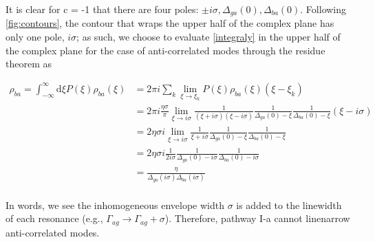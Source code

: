 \documentclass[aip, jcp, reprint, onecolumn]{revtex4-2}
\begin{document}
It is clear for c = -1 that there are four poles: $\pm i \sigma, \Delta_{ga}(0), \Delta_{ba}(0)$. 
Following \autoref{fig:contours}, the contour that wraps the upper half of the complex plane has only one pole, $i \sigma$; as such, we choose to evaluate \autoref{integraly} in the upper half of the complex plane for the case of anti-correlated modes through the residue theorem as
\begin{widetext}
	\begin{equation}
		\begin{split}
			\rho_{ba} = \int_{-\infty}^\infty \mathrm{d}\xi P(\xi) \rho_{ba}(\xi) &= 2\pi i \sum_k \lim_{\xi \rightarrow \xi_k} P(\xi) \rho_{ba}(\xi) (\xi - \xi_k)\\
			&= 2\pi i \frac{\eta \sigma}{\pi} \lim_{\xi \rightarrow i\sigma} \frac{1}{(\xi + i\sigma)(\xi - i\sigma)} \frac{1}{\Delta_{ga}(0) - \xi} \frac{1}{\Delta_{ba}(0) - \xi} (\xi - i \sigma)\\
			&= 2 \eta \sigma i \lim_{\xi \rightarrow i\sigma} \frac{1}{\xi + i\sigma} \frac{1}{\Delta_{ga}(0) - \xi} \frac{1}{\Delta_{ba}(0) - \xi}\\
			&= 2\eta \sigma i \frac{1}{2i\sigma} \frac{1}{\Delta_{ga}(0) - i\sigma} \frac{1}{\Delta_{ba}(0) - i\sigma}\\
			&= \frac{\eta}{\Delta_{ga}(i\sigma)\Delta_{ba}(i \sigma)}\\
		\end{split}
	\end{equation}
\end{widetext}

In words, we see the inhomogeneous envelope width $\sigma$ is added to the linewidth of each resonance (e.g., $\Gamma_{ag} \rightarrow \Gamma_{ag} + \sigma$).
Therefore, pathway I-a cannot linenarrow anti-correlated modes. 
\end{document}
